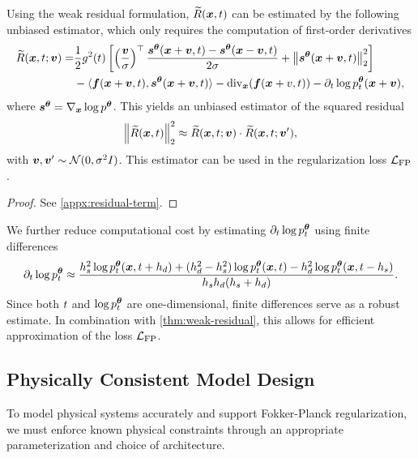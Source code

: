 \begin{mymath}
\begin{theorem}
Using the weak residual formulation, $\widetilde{R} ({{\bm{x}}}, {t})$ can be estimated by the following unbiased estimator, which only requires the computation of first-order derivatives
\begin{align}
\widetilde{R}({{\bm{x}}}, {t} ; {\bm{v}}) = & \frac{1}{2} {g}^2({t}) \left[   \left(\frac{{\bm{v}}}{\sigma}\right)^{\top} \frac{{{\bm{s}}^{\bm{\theta}}}({{\bm{x}}} + {\bm{v}}, {t}) - {{\bm{s}}^{\bm{\theta}}}({{\bm{x}}} - {\bm{v}}, {t})}{2 \sigma} + \left\Vert{{\bm{s}}^{\bm{\theta}}}({{\bm{x}}} + {\bm{v}}, {t})\right\Vert^2_2 \right] \\\nonumber
&
 - \langle {\bm{f}}({{\bm{x}}} + {\bm{v}}, {t}), {{\bm{s}}^{\bm{\theta}}}({{\bm{x}}} + {\bm{v}}, {t}) \rangle - \operatorname{div}_{{\bm{x}}}({\bm{f}}({{\bm{x}}} + v,{t})) - \partial_{t} \log p^{\bm{\theta}}_{t} ({{\bm{x}}} + {\bm{v}}), 
\end{align}
where ${{\bm{s}}^{\bm{\theta}}} = \nabla_{{\bm{x}}} \log p^{\bm{\theta}}$. 
This yields an unbiased estimator of the squared residual
\begin{equation}
    \left\Vert \widetilde{R}({{\bm{x}}},{t})\right\Vert ^{2}_2 \approx \widetilde{R}({{\bm{x}}},{t};{\bm{v}})\cdot\widetilde{R}({{\bm{x}}},{t};{\bm{v}}'),
\end{equation}
with ${\bm{v}}, {\bm{v}}' \sim {\mathcal{N}}(0, \sigma^2 I)$. This estimator can be used in the regularization loss $\mathcal{L}_{\text{FP}}$. 
\label{thm:weak-residual}
\end{theorem}
\begin{proof}
    See \cref{appx:residual-term}.
\end{proof}
\end{mymath}

We further reduce computational cost by estimating $\partial_{t} \log p^{\bm{\theta}}_{t}$ using finite differences \citep{fornberg1988}
\begin{equation}
    \partial_{t} \log p^{\bm{\theta}}_{t} \approx \frac{h_s^2 \log p^{\bm{\theta}}_{t} ({{\bm{x}}}, {t} + h_d) + (h_d^2 - h_s^2) \log p^{\bm{\theta}}_{t} ({{\bm{x}}}, {t}) - h_d^2 \log p^{\bm{\theta}}_{t} ({{\bm{x}}}, {t} - h_s) }{h_s h_d (h_s + h_d)} .
    \label{eq:finite-difference}
\end{equation}
Since both ${t}$ and $\log p^{\bm{\theta}}_{t}$ are one-dimensional, finite differences serve as a robust estimate. In combination with \cref{thm:weak-residual}, this allows for efficient approximation of the loss $\mathcal{L}_{\text{FP}}$.

\subsection{Physically Consistent Model Design}
To model physical systems accurately and support Fokker-Planck regularization, we must enforce known physical constraints through an appropriate parameterization and choice of architecture.

